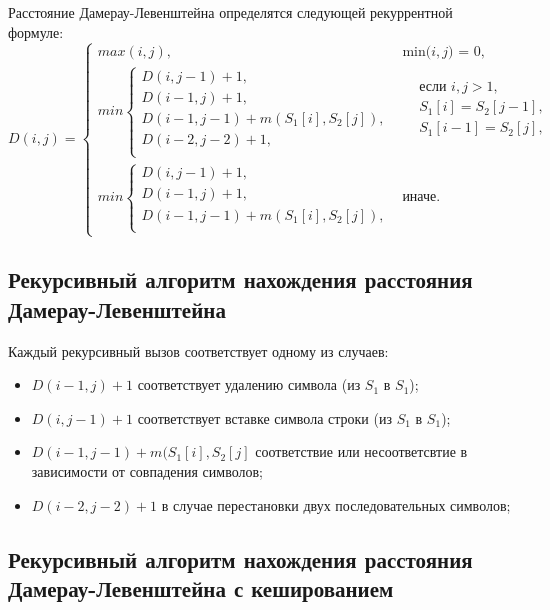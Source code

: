 Расстояние Дамерау-Левенштейна определятся следующей рекуррентной формуле:
\begin{equation}
	\label{eq:DL}
	D(i, j) = 
	\begin{cases}
            max(i, j), &\text{min($i, j$) = 0,}\\
		min \begin{cases}
			D(i, j - 1) + 1,\\
			D(i - 1, j) + 1,\\
			D(i - 1, j - 1) + m(S_{1}[i], S_{2}[j]), \\
			D(i - 2, j - 2) + 1, \\
		\end{cases}
		& \begin{aligned}
			& \text{если $i, j > 1$}, \\
			& S_{1}[i] = S_{2}[j - 1], \\
			& S_{1}[i - 1] = S_{2}[j], \\
		\end{aligned}\\
		min \begin{cases}
			D(i, j - 1) + 1,\\
			D(i - 1, j) + 1, \\
			D(i - 1, j - 1) + m(S_{1}[i], S_{2}[j]), \\
		\end{cases}
		 & \text{иначе.}
	\end{cases}
\end{equation}

\subsection{Рекурсивный алгоритм нахождения расстояния Дамерау-Левенштейна}

Каждый рекурсивный вызов соответствует одному из случаев:
\begin{itemize}
    \item $D(i - 1, j) + 1$ соответствует удалению символа (из $S_{1}$ в $S_{1}$);
    \item $D(i, j - 1) + 1$ соответствует вставке символа строки (из $S_{1}$ в $S_{1}$);
    \item $D(i - 1, j - 1) + m(S_{1}[i], S_{2}[j]$ соответствие или несоответсвтие в зависимости от совпадения символов;
    \item $D(i - 2, j - 2) + 1$ в случае перестановки двух последовательных символов;
\end{itemize}

\subsection{Рекурсивный алгоритм нахождения расстояния Дамерау-Левенштейна с кешированием}

